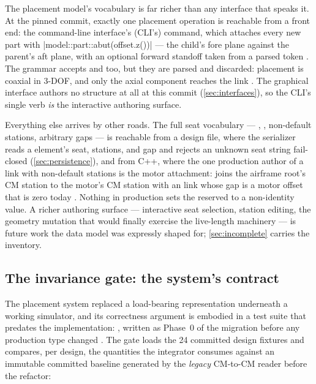 The placement model's vocabulary is far richer than any interface that speaks it. At the
pinned commit, exactly one placement operation is reachable from a front end: the
command-line interface's (CLI's)  command, which attaches every new part
with \cppinline|model::part::abut(offset.z())| --- the child's fore plane against the
parent's aft plane, with an optional forward standoff taken from a parsed  token
. The grammar accepts  and  too, but they are
parsed and discarded: placement is coaxial in 3-DOF, and only the axial component reaches
the link . The graphical interface authors no structure at all at
this commit (\cref{sec:interfaces}), so the CLI's single verb \emph{is} the interactive
authoring surface.

Everything else arrives by other roads. The full seat vocabulary ---
, , non-default stations, arbitrary gaps --- is reachable
from a design file, where the serializer reads a  element's seat, stations,
and gap  and rejects an unknown seat string
fail-closed  (\cref{sec:persistence}), and from C++,
where the one production author of a link with non-default stations is the motor attachment:
 joins the airframe root's CM station to the motor's CM
station with an  link whose gap is a motor offset that is zero today
. Nothing in production sets the reserved 
to a non-identity value. A richer authoring surface --- interactive seat selection,
station editing, the geometry mutation that would finally exercise the live-length
machinery --- is future work the data model was expressly shaped for;
\cref{sec:incomplete} carries the inventory.

\subsection{The invariance gate: the system's contract}\label{sec:placement-invariance}

The placement system replaced a load-bearing representation underneath a working
simulator, and its correctness argument is embodied in a test suite that predates the
implementation: , written as Phase~0 of the
migration before any production type changed .
The gate loads the 24 committed design fixtures 
and compares, per design, the quantities the integrator consumes against an immutable
committed baseline generated by the \emph{legacy} CM-to-CM reader before the refactor:


